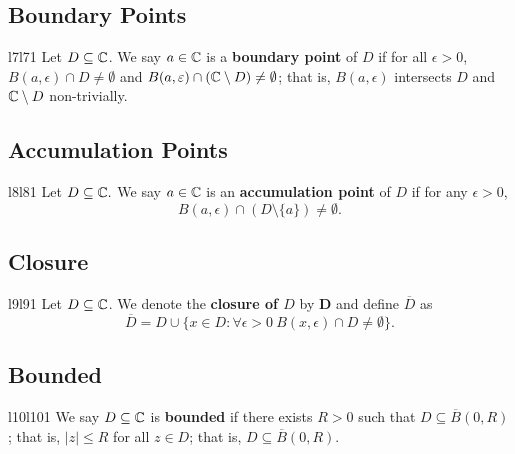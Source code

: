 \documentclass[a4paper]{article}
\begin{document}
\subsection*{Boundary Points}

\begin{ocg}{l7}{l7}{1}
   Let \( D \subseteq  \mathbb{C}  \). We say \( a \in \mathbb{C}  \) is a \textbf{boundary point} of \( D  \) if for all \( \epsilon > 0  \), \( B(a,\epsilon) \cap D \neq \emptyset \) and \( B(a,\varepsilon) \cap (\mathbb{C} \setminus  D ) \neq \emptyset  \); that is, \( B(a,\epsilon) \) intersects \( D  \) and \( \mathbb{C} \setminus  D   \) non-trivially.  
\end{ocg}
\newline
{}

\subsection*{Accumulation Points}

\begin{ocg}{l8}{l8}{1}
Let \( D \subseteq  \mathbb{C} . \) We say \( a \in \mathbb{C}  \) is an \textbf{accumulation point} of \( D  \) if for any \( \epsilon > 0  \),
\[  B(a,\epsilon) \cap (D \setminus  \{ a \} ) \neq \emptyset. \]
\end{ocg}
\newline
{}

\subsection*{Closure}

\begin{ocg}{l9}{l9}{1}
    Let \( D \subseteq \mathbb{C} \). We denote the \textbf{closure of \( D \)} by \( \textbf{D} \) and define \( \overline{D} \) as 
    \[  \overline{D} = D \cup \{ x \in D : \forall \epsilon > 0  \  B(x,\epsilon) \cap D \neq \emptyset \}.  \]
\end{ocg}
\newline
{}

\subsection*{Bounded}

\begin{ocg}{l10}{l10}{1}
    We say \( D \subseteq \mathbb{C}  \) is \textbf{bounded} if there exists \( R > 0  \) such that \( D \subseteq \overline{B}(0,R) \); that is, \( | z  |  \leq R  \) for all \( z \in D  \); that is, \( D \subseteq  \overline{B}(0,R) \).
\end{ocg}
\newline
{}
\end{document}
